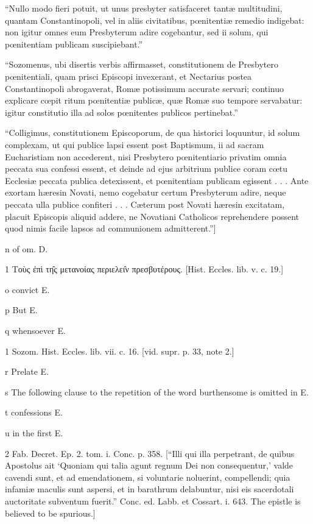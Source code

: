 “Nullo modo fieri potuit, ut unus presbyter satisfaceret tantæ multitudini, quantam Constantinopoli, vel in aliis civitatibus, pœnitentiæ remedio indigebat: non igitur omnes eum Presbyterum adire cogebantur, sed ii solum, qui pœnitentiam publicam suscipiebant.”

“Sozomenus, ubi disertis verbis affirmasset, constitutionem de Presbytero pœnitentiali, quam prisci Episcopi invexerant, et Nectarius postea Constantinopoli abrogaverat, Romæ potissimum accurate servari; continuo explicare cœpit ritum pœnitentiæ publicæ, quæ Romæ suo tempore servabatur: igitur constitutio illa ad solos pœnitentes publicos pertinebat.”

“Colligimus, constitutionem Episcoporum, de qua historici loquuntur, id solum complexam, ut qui publice lapsi essent post Baptismum, ii ad sacram Eucharistiam non accederent, nisi Presbytero pœnitentiario privatim omnia peccata sua confessi essent, et deinde ad ejus arbitrium publice coram cœtu Ecclesiæ peccata publica detexissent, et pœnitentiam publicam egissent . . . Ante exortam hæresin Novati, nemo cogebatur certum Presbyterum adire, neque peccata ulla publice confiteri . . . Cæterum post Novati hæresin excitatam, placuit Episcopis aliquid addere, ne Novatiani Catholicos reprehendere possent quod nimis facile lapsos ad communionem admitterent.”]

n
of om. D.

1
Τοὺς ἐπὶ τη̑ς μετανοίας περιελει̑ν πρεσβυτέρους. [Hist. Eccles. lib. v. c. 19.]

o
convict E.

p
But E.

q
whensoever E.

1
Sozom. Hist. Eccles. lib. vii. c. 16. [vid. supr. p. 33, note 2.]

r
Prelate E.

s
The following clause to the repetition of the word burthensome is omitted in E.

t
confessions E.

u
in the first E.

2
Fab. Decret. Ep. 2. tom. i. Conc. p. 358. [“Illi qui illa perpetrant, de quibus Apostolus ait ‘Quoniam qui talia agunt regnum Dei non consequentur,’ valde cavendi sunt, et ad emendationem, si voluntarie noluerint, compellendi; quia infamiæ maculis sunt aspersi, et in barathrum delabuntur, nisi eis sacerdotali auctoritate subventum fuerit.” Conc. ed. Labb. et Cossart. i. 643. The epistle is believed to be spurious.]


